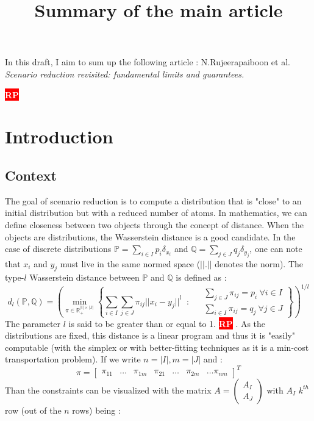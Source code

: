 \documentclass{amsart}
\title{Summary of the main article}
\newcommand{\nb}[3]{
		{\colorbox{#2}{\bfseries\sffamily\tiny\textcolor{white}{#1}}}
		{\textcolor{#2}{\text{$\blacktriangleright$}{\textcolor{#2}{#3}}\text{$\blacktriangleleft$}}}}
\newcommand{\rp}[1]{\nb{RP}{red}{#1}}
\begin{document}
\maketitle
In this draft, I aim to sum up the following article : N.Rujeerapaiboon et al. \textit{Scenario reduction revisited: fundamental limits and
guarantees.}
\rp{I guess it's not the right way to cite an article... but I don't know the right way.}
\section{Introduction}
\subsection{Context}
The goal of scenario reduction is to compute a distribution that is "close" to an initial distribution but with a reduced number of atoms. In mathematics, we can define closeness between two objects through the concept of distance. When the objects are distributions, the Wasserstein distance is a good candidate. In the case of discrete distributions $\mathbb{P}=\sum_{i\in I}p_i\delta_{x_i}$ and $\mathbb{Q}=\sum_{j\in J}q_j\delta_{y_j}$, one can note that $x_i$ and $y_j$ must live in the same normed space ($||.||$ denotes the norm). The type-$l$ Wasserstein distance between $\mathbb{P}$ and $\mathbb{Q}$ is defined as :  
\[
d_l(\mathbb{P},\mathbb{Q})=\left(\min_{\pi\in\mathbb{R_+^{|I|\times|J|}}}\left\{ 
\sum_{i\in I}\sum_{j\in J}\pi_{ij}||x_i-y_j||^l \: \text{ : } \:  \begin{aligned}
& \sum_{j\in J}\pi_{ij}=p_i \: \forall i\in I \\
& \sum_{i\in I}\pi_{ij}=q_j \: \forall j\in J
\end{aligned}\right\}\right)^{1/l}
\]
The parameter $l$ is said to be greater than or equal to 1. \rp{don't really know why it's not only greater than 0}. As the distributions are fixed, this distance is a linear program and thus it is "easily" computable (with the simplex or with better-fitting techniques as it is a min-cost transportation problem).
If we write $n=|I|, m=|J|$ and :
$$
\pi=\begin{bmatrix}
    \pi_{11}& \hdots&\pi_{1m}&\pi_{21}&\hdots&\pi_{2m}&\hdots\pi_{nm}
\end{bmatrix}^T
$$
Than the constraints can be visualized with the matrix $A=\begin{pmatrix}
    A_I \\
    A_J
\end{pmatrix}$ with $A_I$ $k^{th}$ row (out of the $n$ rows) being : 
\end{document}
